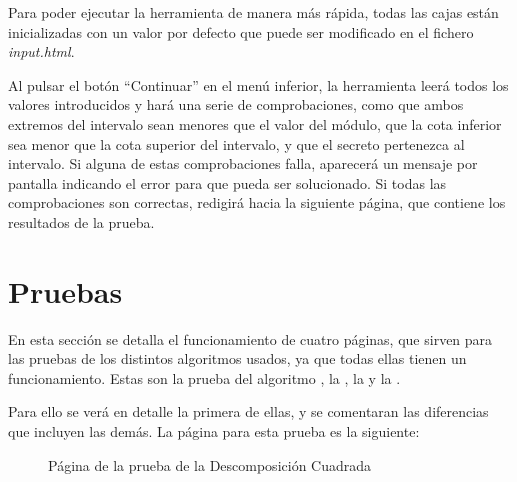 Para poder ejecutar la herramienta de manera más rápida, todas las cajas están inicializadas con un valor por defecto que puede ser modificado en el fichero \emph{input.html}.

Al pulsar el botón ``Continuar'' en el menú inferior, la herramienta leerá todos los valores introducidos y hará una serie de comprobaciones, como que ambos extremos del intervalo sean menores que el valor del módulo, que la cota inferior sea menor que la cota superior del intervalo, y que el secreto pertenezca al intervalo. Si alguna de estas comprobaciones falla, aparecerá un mensaje por pantalla indicando el error para que pueda ser solucionado. Si todas las comprobaciones son correctas, redigirá hacia la siguiente página, que contiene los resultados de la prueba.

\section*{Pruebas}

En esta sección se detalla el funcionamiento de cuatro páginas, que sirven para las pruebas de los distintos algoritmos usados, ya que todas ellas tienen un funcionamiento. Estas son la prueba del algoritmo , la , la  y la .

Para ello se verá en detalle la primera de ellas, y se comentaran las diferencias que incluyen las demás. La página para esta prueba es la siguiente:
\begin{figure}[H]
    \centering
    \caption{Página de la prueba de la Descomposición Cuadrada}
    \label{im:proveSD2}
\end{figure}

